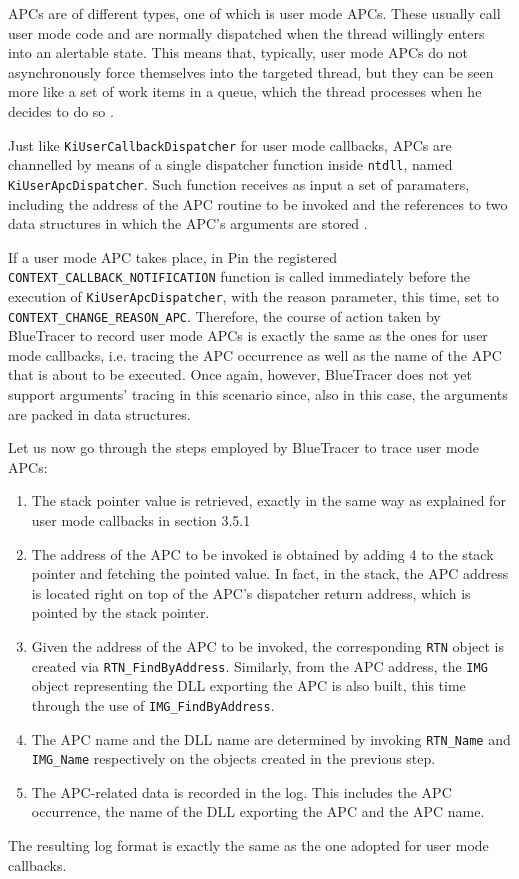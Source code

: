 APCs are of different types, one of which is user mode APCs. These usually call user mode code and are normally dispatched when the thread willingly enters into an alertable state. This means that, typically, user mode APCs do not asynchronously force themselves into the targeted thread, but they can be seen more like a set of work items in a queue, which the thread processes when he decides to do so \cite{APC1}.

Just like \texttt{KiUserCallbackDispatcher} for user mode callbacks, APCs are channelled by means of a single dispatcher function inside \texttt{ntdll}, named \texttt{KiUserApcDispatcher}. Such function receives as input a set of paramaters, including the address of the APC routine to be invoked and the references to two data structures in which the APC's arguments are stored \cite{APC2}.  
 
If a user mode APC takes place, in Pin the registered \texttt{CONTEXT\_CALLBACK\_NOTIFICATION} function is called immediately before the execution of \texttt{KiUserApcDispatcher}, with the reason parameter, this time, set to \texttt{CONTEXT\_CHANGE\_REASON\_APC}. Therefore, the course of action taken by BlueTracer to record user mode APCs is exactly the same as the ones for user mode callbacks, i.e. tracing the APC occurrence as well as the name of the APC that is about to be executed. Once again, however, BlueTracer does not yet support arguments' tracing in this scenario since, also in this case, the arguments are packed in data structures.

Let us now go through the steps employed by BlueTracer to trace user mode APCs:
\begin{enumerate}
\item The stack pointer value is retrieved, exactly in the same way as explained for user mode callbacks in section 3.5.1
\item The address of the APC to be invoked is obtained by adding 4 to the stack pointer and fetching the pointed value. In fact, in the stack, the APC address is located right on top of the APC's dispatcher return address, which is pointed by the stack pointer.
\item Given the address of the APC to be invoked, the corresponding \texttt{RTN} object is created via \texttt{RTN\_FindByAddress}. Similarly, from the APC address, the \texttt{IMG} object representing the DLL exporting the APC is also built, this time through the use of \texttt{IMG\_FindByAddress}.
\item The APC name and the DLL name are determined by invoking \texttt{RTN\_Name} and \texttt{IMG\_Name} respectively on the objects created in the previous step.
\item The APC-related data is recorded in the log. This includes the APC occurrence, the name of the DLL exporting the APC and the APC name. 
\end{enumerate}
 
The resulting log format is exactly the same as the one adopted for user mode callbacks. 
 

